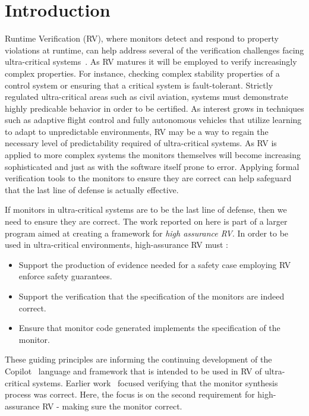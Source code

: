 \section{Introduction}\label{sec:intro}
Runtime Verification (RV), where monitors detect and respond to
property violations at runtime, can help address several of the
verification challenges facing ultra-critical
systems~\cite{pike-rv-11}.  As RV matures it will be employed to
verify increasingly complex properties. For instance, checking complex
stability properties of a control system or ensuring that a critical
system is fault-tolerant.  Strictly regulated ultra-critical areas
such as civil aviation, systems must demonstrate highly predicable
behavior in order to be certified. As interest grows in techniques
such as adaptive flight control and fully autonomous vehicles that
utilize learning to adapt to unpredictable environments, RV may be a
way to regain the necessary level of predictability required of
ultra-critical systems.  As RV is applied to more complex systems the
monitors themselves will become increasing sophisticated and just as
with the software itself prone to error.  Applying formal verification
tools to the monitors to ensure they are correct can help safeguard
that the last line of defense is actually effective.

  If monitors in ultra-critical
systems are to be the last line of defense, then we need to ensure
they are correct. The work reported on here is part of a larger
program aimed at creating a framework for \emph{high assurance RV}. In
order to be used in ultra-critical environments, high-assurance RV
must : 
\begin{itemize}
\item Support the production of evidence needed for a safety case
  employing RV enforce safety guarantees.
\item Support the verification that the specification of the monitors
  are indeed correct. 
\item Ensure that monitor code generated implements the specification of the
monitor. 
\end{itemize} 
 These guiding principles are informing the continuing development of the Copilot~\cite{copilot,pike-isse-13} language and framework that is
intended to be used in RV of ultra-critical systems.  Earlier
work~\cite{pike-icfp-12} focused verifying that the monitor synthesis
process was correct. Here, the focus is on the second requirement for
high-assurance RV - making sure the monitor  correct. 

